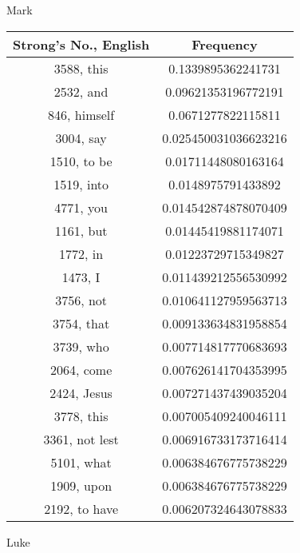 \documentclass[12pt,letterpaper]{article}
\begin{document}
Mark


 \begin{longtable}{|c|c|}
\hline
 Strong's No., English & Frequency \\ \hline  
3588, this & 0.1339895362241731\\ \hline 
 2532, and & 0.09621353196772191\\ \hline 
 846, himself & 0.0671277822115811\\ \hline 
 3004, say & 0.025450031036623216\\ \hline 
 1510, to be & 0.01711448080163164\\ \hline 
 1519, into & 0.0148975791433892\\ \hline 
 4771, you & 0.014542874878070409\\ \hline 
 1161, but & 0.01445419881174071\\ \hline 
 1772, in & 0.01223729715349827\\ \hline 
 1473, I & 0.011439212556530992\\ \hline 
 3756, not & 0.010641127959563713\\ \hline 
 3754, that & 0.009133634831958854\\ \hline 
 3739, who & 0.007714817770683693\\ \hline 
 2064, come & 0.007626141704353995\\ \hline 
 2424, Jesus & 0.007271437439035204\\ \hline 
 3778, this & 0.007005409240046111\\ \hline 
 3361, not lest & 0.006916733173716414\\ \hline 
 5101, what & 0.006384676775738229\\ \hline 
 1909, upon & 0.006384676775738229\\ \hline 
 2192, to have & 0.006207324643078833\\ \hline 
\end{longtable} 
 

Luke
\end{document}
